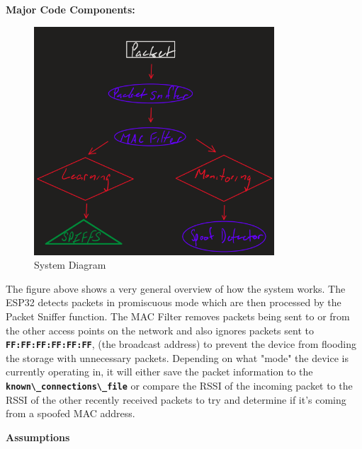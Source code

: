 \documentclass[letterpaper, 11pt]{article}
\newcommand{\secHeader}[1]{\vspace{2mm} \noindent \textbf{#1:}\vspace{-4mm}}
\begin{document}
\newpage
\secHeader{Major Code Components}
\vspace{5mm}

\begin{figure}[H] %
    \centering
    \includegraphics[width=0.8\textwidth]{Diagram.png}
    \caption{System Diagram}
    \label{fig:SystemDiagram}
\end{figure}

The figure above shows a very general overview of how the system works. The ESP32 detects packets in promiscuous mode which are then processed by the Packet Sniffer function. The MAC 
Filter removes packets being sent to or from the other access points on the network and also ignores packets sent to \textbf{\lstinline[]|FF:FF:FF:FF:FF:FF|}, (the broadcast address) to prevent the device from
flooding the storage with unnecessary packets. Depending on what "mode" the device is currently operating in, it will either save the packet information to the 
\textbf{\lstinline[]|known\_connections\_file|} or compare the RSSI of the incoming packet to the RSSI of the other recently received packets to try and determine if it's coming from a 
spoofed MAC address.

\newpage
\vspace{5mm}
\noindent\textbf{Assumptions}
\end{document}
